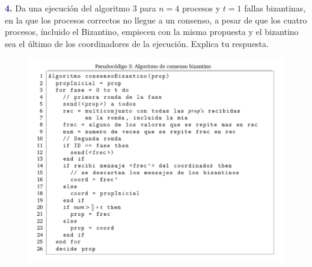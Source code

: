 \newpage
\textbf{\textcolor{MidnightBlue}{4.}} Da una ejecución del algoritmo 3 para $n=4$ procesos y $t=1$ fallas bizantinas, en la que los procesos correctos no llegue a un consenso, a pesar de que los cuatro procesos, íncluido el Bizantino, empiecen con la misma propuesta y el bizantino sea el último de los coordinadores de la ejecución. Explica tu respuesta.
\begin{figure}
  \includegraphics[width=\textwidth]{consensoBizantino.png}
\end{figure}